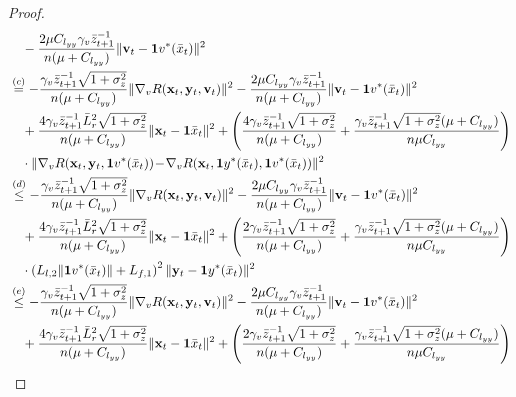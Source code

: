 \documentclass{article}
\theoremstyle{plain}
\theoremstyle{definition}
\theoremstyle{remark}
\begin{document}
\begin{proof}
\begin{align}
&\quad - \frac{2\mu C_{l_{yy}}\gamma_v\bar{z}_{t+1}^{-1}}{n(\mu + C_{l_{yy}})}  \|\mathbf{v}_t - \mathbf{1}v^*(\bar{x}_t)\|^2 \nonumber\\
&\overset{(c)}{=} -\frac{\gamma_v\bar{z}_{t+1}^{-1}\sqrt{1+\sigma_z^2}}{n(\mu + C_{l_{yy}})} \|\nabla_v R(\mathbf{x}_t, \mathbf{y}_t, \mathbf{v}_t)\|^2 - \frac{2\mu C_{l_{yy}}\gamma_v\bar{z}_{t+1}^{-1}}{n(\mu + C_{l_{yy}})}  \|\mathbf{v}_t - \mathbf{1}v^*(\bar{x}_t)\|^2\nonumber\\
&\quad+\frac{4\gamma_v\bar{z}_{t+1}^{-1}\bar{L}_r^2\sqrt{1+\sigma_z^2}}{n(\mu + C_{l_{yy}})}\|\mathbf{x}_t-\mathbf{1}\bar{x}_t\|^2+\left(\frac{4\gamma_v\bar{z}_{t+1}^{-1}\sqrt{1+\sigma_z^2}}{n(\mu + C_{l_{yy}})}+\frac{\gamma_v\bar{z}_{t+1}^{-1}\sqrt{1+\sigma_z^2}(\mu + C_{l_{yy}})}{n\mu C_{l_{yy}}} \right)\nonumber \\
&\quad \cdot\|\nabla_v R(\mathbf{x}_t, \mathbf{y}_t, \mathbf{1}v^*(\bar{x}_t)) \!-\! \nabla_v R(\mathbf{x}_t, \mathbf{1}y^*(\bar{x}_t), \mathbf{1}v^*(\bar{x}_t))\|^2  \nonumber\\
&\overset{(d)}{\leq} -\frac{\gamma_v\bar{z}_{t+1}^{-1}\sqrt{1+\sigma_z^2}}{n(\mu + C_{l_{yy}})} \|\nabla_v R(\mathbf{x}_t, \mathbf{y}_t, \mathbf{v}_t)\|^2 - \frac{2\mu C_{l_{yy}}\gamma_v\bar{z}_{t+1}^{-1}}{n(\mu + C_{l_{yy}})}  \|\mathbf{v}_t - \mathbf{1}v^*(\bar{x}_t)\|^2\nonumber\\
&\quad+\frac{4\gamma_v\bar{z}_{t+1}^{-1}\bar{L}_r^2\sqrt{1+\sigma_z^2}}{n(\mu + C_{l_{yy}})}\|\mathbf{x}_t-\mathbf{1}\bar{x}_t\|^2 +\left(\frac{2\gamma_v\bar{z}_{t+1}^{-1}\sqrt{1+\sigma_z^2}}{n(\mu + C_{l_{yy}})}+\frac{\gamma_v\bar{z}_{t+1}^{-1}\sqrt{1+\sigma_z^2}(\mu + C_{l_{yy}})}{n\mu C_{l_{yy}}} \right)\nonumber \\
&\quad \cdot\left(L_{l,2}\|\mathbf{1}v^*(\bar{x}_t)\|+L_{f,1}\right)^2\|\mathbf{y}_t - \mathbf{1}y^*(\bar{x}_t)\|^2\nonumber\\
&\overset{(e)}{\leq} -\frac{\gamma_v\bar{z}_{t+1}^{-1}\sqrt{1+\sigma_z^2}}{n(\mu + C_{l_{yy}})} \|\nabla_v R(\mathbf{x}_t, \mathbf{y}_t, \mathbf{v}_t)\|^2 - \frac{2\mu C_{l_{yy}}\gamma_v\bar{z}_{t+1}^{-1}}{n(\mu + C_{l_{yy}})}  \|\mathbf{v}_t - \mathbf{1}v^*(\bar{x}_t)\|^2\notag\\
&\quad+\frac{4\gamma_v\bar{z}_{t+1}^{-1}\bar{L}_r^2\sqrt{1+\sigma_z^2}}{n(\mu + C_{l_{yy}})}\|\mathbf{x}_t-\mathbf{1}\bar{x}_t\|^2+ \left(\frac{2\gamma_v\bar{z}_{t+1}^{-1}\sqrt{1+\sigma_z^2}}{n(\mu + C_{l_{yy}})}+\frac{\gamma_v\bar{z}_{t+1}^{-1}\sqrt{1+\sigma_z^2}(\mu + C_{l_{yy}})}{n\mu C_{l_{yy}}} \right) \nonumber \\

\end{align}
\end{proof}
\end{document}
